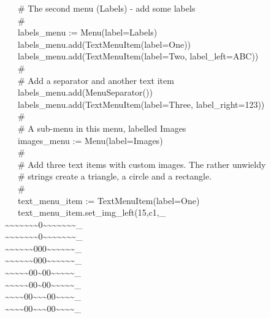 {\>   \ \ \ \# The second menu ({\textquotedbl}Labels{\textquotedbl}) -
add some labels \\
\>   \ \ \ \# \\
\>   \ \ \ labels\_menu :=
Menu({\textquotedbl}label=Labels{\textquotedbl}) \\
\>   \ \ \ labels\_menu.add(TextMenuItem({\textquotedbl}label=One{\textquotedbl})) \\
\>   \ \ \ labels\_menu.add(TextMenuItem({\textquotedbl}label=Two{\textquotedbl},
{\textquotedbl}label\_left=ABC{\textquotedbl})) \\
\>   \ \ \ \# \\
\>   \ \ \ \# Add a separator and another text item \\
\>   \ \ \ labels\_menu.add(MenuSeparator()) \\
\>   \ \ \ labels\_menu.add(TextMenuItem({\textquotedbl}label=Three{\textquotedbl},
{\textquotedbl}label\_right=123{\textquotedbl})) \\
\>   \ \ \ \# \\
\>   \ \ \ \# A sub-menu in this menu, labelled
{\textquotedbl}Images{\textquotedbl} \\
\>   \ \ \ images\_menu :=
Menu({\textquotedbl}label=Images{\textquotedbl}) \\
\>   \ \ \ \# \\
\>   \ \ \ \# Add three text items with custom images. The rather unwieldy \\
\>   \ \ \ \# strings create a triangle, a circle and a rectangle. \\
\>   \ \ \ \# \\
\>   \ \ \ text\_menu\_item :=
TextMenuItem({\textquotedbl}label=One{\textquotedbl}) \\
\>   \ \ \ text\_menu\_item.set\_img\_left({\textquotedbl}15,c1,\_ \\
\~{}\~{}\~{}\~{}\~{}\~{}\~{}0\~{}\~{}\~{}\~{}\~{}\~{}\~{}\_ \\
\~{}\~{}\~{}\~{}\~{}\~{}\~{}0\~{}\~{}\~{}\~{}\~{}\~{}\~{}\_ \\
\~{}\~{}\~{}\~{}\~{}\~{}000\~{}\~{}\~{}\~{}\~{}\~{}\_ \\
\~{}\~{}\~{}\~{}\~{}\~{}000\~{}\~{}\~{}\~{}\~{}\~{}\_ \\
\~{}\~{}\~{}\~{}\~{}00\~{}00\~{}\~{}\~{}\~{}\~{}\_ \\
\~{}\~{}\~{}\~{}\~{}00\~{}00\~{}\~{}\~{}\~{}\~{}\_ \\
\~{}\~{}\~{}\~{}00\~{}\~{}\~{}00\~{}\~{}\~{}\~{}\_ \\
\~{}\~{}\~{}\~{}00\~{}\~{}\~{}00\~{}\~{}\~{}\~{}\_ \\
}
